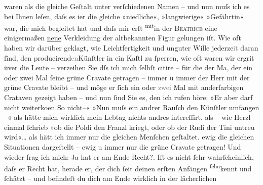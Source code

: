 \begin{ledgroupsized}[t]{13cm}
               waren als die gleiche Geſtalt unter verſchiedenen Na{\pb}men – und nun muſs ich es bei Ihnen \strikeout{\textcolor{gray}{×}\-\textcolor{gray}{×}\-\textcolor{gray}{×}\-\textcolor{gray}{×}} leſen, daſs  es i{\geminationm}er die gleiche »niedliche«, »langwierige«
               »Gefährtin« war, die mich begleitet hat und daſs 
               mir erſt \substVorne{}\textsuperscript{mit}\substDazwischen{}in\substHinten{} der \textsc{Beatrice} eine einigermaßen \uline{neue} Verkleidung der
               altbekannten Figur gelungen iſt. Wie oft haben wir darüber geklagt, wie
               Leichtfertigkeit und unguter Wille jederze\textcolor{gray}{it} daran ſind, den
                  producirend\textcolor{gray}{en}{\pb}Künſtler in ein Kaſtl zu ſperren, wie oft
               waren wir ergri{\geminationm}t\strikeout{,} üver
               die Leute – verzeihen Sie dſs ich mich ſelbſt citire – für die der Ma{\geminationn}, der ein oder zwei Mal ſeine grüne Cravate getragen –
               immer u immer der Herr mit der grüne Cravate bleibt – und möge er ſich ein oder
                  \textcolor{gray}{zwei} Mal mit anderfarbigen Crataven gezeigt haben – und nun
               ſind Sie es, den {\pb}ich rufen höre: »Er aber
               darf nicht weiterko{\geminationm}en {\dotstwo} So
               nicht–« »Nun muſs ein andrer Rauſch den Künſtler umfangen –« als hätte mich wirklich
               mein Lebtag nichts andres intereſſirt, als – wie Herzl einmal ſchrieb \textcolor{gray}{»}ob die Poldi den Franzl kriegt,
               oder ob der Rudi der Tini untreu wird«{\dots} als hätt ich immer
               nur die gleichen Menſchen geſtaltet. {\pb}ewig
               die gleichen Situationen dargeſtellt – ewig u immer nur die grüne Cravate getragen!
               Und wieder frag ich mich: Ja hat er am Ende Recht?. Iſt es nicht ſehr wahrſcheinlich,
               daſs er Recht hat, herade er, der dich ſeit deinen erſten Anfängen \substVorne{}\textsuperscript{ſchä}\substDazwischen{}ke\substHinten{}nnt und ſchätzt – und befindeſt du dich am Ende wirklich in der lächerlichen

\end{ledgroupsized}
